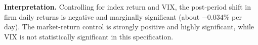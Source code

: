\documentclass[11pt]{article}
\begin{document}
\textbf{Interpretation.} Controlling for index return and VIX, the post-period shift in firm daily returns is negative and marginally significant (about $-0.034\%$ per day). The market-return control is strongly positive and highly significant, while VIX is not statistically significant in this specification.
\end{document}
